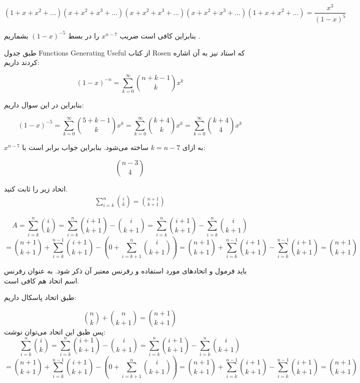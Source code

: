 \documentclass[11pt,largemargins]{h2wp}
\begin{document}
              
                $$(1 + x + x^2 + ...)(x + x^2 + x^3 + ...)(x + x^2 + x^3 + ...)(x + x^2 + x^3 + ...)(1 + x + x^2 + ...) = \frac{x^3}{(1 - x)^5}$$
                
                 بنابراین کافی است ضریب $x^{n - 7}$ را در بسط
                  $(1 - x)^{-5}$
         بشماریم . 
               
               
                   طبق جدول  
                  Functions Generating Useful
		از کتاب Rosen
		که استاد نیز به آن اشاره کردند داریم:
		
       
		    $$(1 - x) ^ {-n} = \sum_{k = 0}^{\infty} \binom{n + k - 1}{k} x^{k} $$

	    بنابراین در این سوال داریم:
                
                    $$(1 - x)^{-5} = \sum_{k = 0}^{\infty} \binom{5 + k - 1}{k}x^k
                    = \sum_{k = 0}^{\infty} \binom{k + 4}{k}x^k
                    = \sum_{k = 0}^{\infty} \binom{k + 4}{4}x^k$$
             
                $x^{n - 7}$ به ازای $k = n -7$ ساخته می‌شود. بنابراین جواب برابر است با:
                
               
                    $$\binom{n - 3}{4}$$
        

\question

 اتحاد زیر را ثابت کنید.
     \begin{align*}
     \sum_{i=k}^{n} {\binom{i}{k}} = \binom{n+1}{k+1}
     \end{align*}
     
\solution

\[A=\sum_{i=k}^{n} {\binom{i}{k}} =\sum_{i=k}^{n} {\binom{i+1}{k+1}-\binom{i}{k+1}}=\sum_{i=k}^{n} {\binom{i+1}{k+1}}-\sum_{i=k}^{n} {\binom{i}{k+1}}\]\[=\binom{n+1}{k+1}+\sum_{i=k}^{n-1} {\binom{i+1}{k+1}}-(0+\sum_{i=k+1}^{n} {\binom{i}{k+1}})=\binom{n+1}{k+1}+\sum_{i=k}^{n-1} {\binom{i+1}{k+1}}-\sum_{i=k}^{n-1} {\binom{i+1}{k+1}}=\binom{n+1}{k+1}\]



\notes

  باید فرمول و اتحادهای مورد استفاده و رفرنس معتبر آن ‌ذکر شود‌. به عنوان رفرنس اسم اتحاد هم کافی است. 
       	 
 
 
 
 طبق اتحاد پاسکال داریم:

$$ \binom{n}{k}+\binom{n}{k+1}=\binom{n+1}{k+1}$$
پس ظبق این اتحاد می‌توان نوشت:
\[\]
\[\sum_{i=k}^{n} {\binom{i}{k}} =\sum_{i=k}^{n} {\binom{i+1}{k+1}-\binom{i}{k+1}}=\sum_{i=k}^{n} {\binom{i+1}{k+1}}-\sum_{i=k}^{n} {\binom{i}{k+1}}\]\[=\binom{n+1}{k+1}+\sum_{i=k}^{n-1} {\binom{i+1}{k+1}}-(0+\sum_{i=k+1}^{n} {\binom{i}{k+1}})=\binom{n+1}{k+1}+\sum_{i=k}^{n-1} {\binom{i+1}{k+1}}-\sum_{i=k}^{n-1} {\binom{i+1}{k+1}}=\binom{n+1}{k+1}\]
\end{document}
